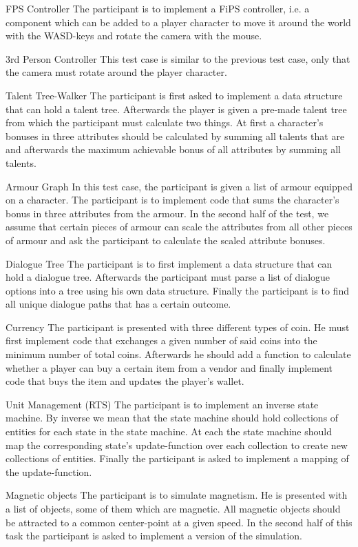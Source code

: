 \begin{labeling}{\quad\quad}
    \item[FPS Controller] The participant is to implement a \gls{FiPS} controller, i.e. a component which can be added to a player character to move it around the world with the WASD-keys and rotate the camera with the mouse.
    \item[3rd Person Controller] This test case is similar to the previous test case, only that the camera must rotate around the player character.
    \item[Talent Tree-Walker] The participant is first asked to implement a data structure that can hold a talent tree. Afterwards the player is given a pre-made talent tree from which the participant must calculate two things. At first a character's bonuses in three attributes should be calculated by summing all talents that are  and afterwards the maximum achievable bonus of all attributes by summing all talents.
    \item[Armour Graph] In this test case, the participant is given a list of armour equipped on a character. The participant is to implement code that sums the character's bonus in three attributes from the armour. In the second half of the test, we assume that certain pieces of armour can scale the attributes from all other pieces of armour and ask the participant to calculate the scaled attribute bonuses.
    \item[Dialogue Tree] The participant is to first implement a data structure that can hold a dialogue tree. Afterwards the participant must parse a list of dialogue options into a tree using his own data structure. Finally the participant is to find all unique dialogue paths that has a certain outcome.
    \item[Currency] The participant is presented with three different types of coin. He must first implement code that exchanges a given number of said coins into the minimum number of total coins. Afterwards he should add a function to calculate whether a player can buy a certain item from a vendor and finally implement code that buys the item and updates the player's wallet.
    \item[Unit Management (RTS)] The participant is to implement an inverse state machine. By inverse we mean that the state machine should hold collections of entities for each state in the state machine. At each  the state machine should map the corresponding state's update-function over each collection to create new collections of entities. Finally the participant is asked to implement a  mapping of the update-function.
    \item[Magnetic objects] The participant is to simulate magnetism. He is presented with a list of objects, some of them which are magnetic. All magnetic objects should be attracted to a common center-point at a given speed. In the second half of this task the participant is asked to implement a  version of the simulation.
\end{labeling}

